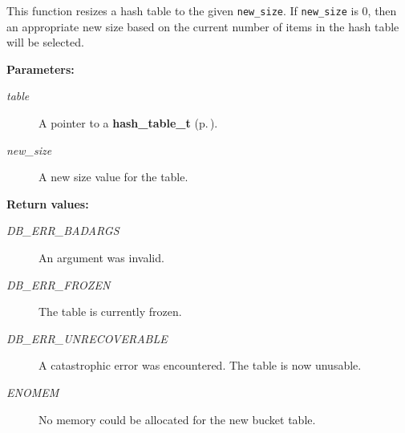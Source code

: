  This function resizes a hash table to the given {\tt new\_\-size}. If {\tt new\_\-size} is 0, then an appropriate new size based on the current number of items in the hash table will be selected.\begin{Desc}
\item[{\bf Parameters: }]\par
\begin{description}
\item[
{\em table}]A pointer to a {\bf hash\_\-table\_\-t} {\rm (p.\,\pageref{group__dbprim__hash_a0})}. \item[
{\em new\_\-size}]A new size value for the table.\end{description}
\end{Desc}
\begin{Desc}
\item[{\bf Return values: }]\par
\begin{description}
\item[
{\em DB\_\-ERR\_\-BADARGS}]An argument was invalid. \item[
{\em DB\_\-ERR\_\-FROZEN}]The table is currently frozen. \item[
{\em DB\_\-ERR\_\-UNRECOVERABLE}]A catastrophic error was encountered. The table is now unusable. \item[
{\em ENOMEM}]No memory could be allocated for the new bucket table. \end{description}
\end{Desc}
